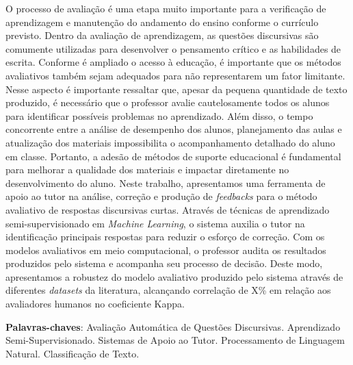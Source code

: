 O processo de avaliação é uma etapa muito importante para a verificação de aprendizagem e manutenção do andamento do ensino conforme o currículo previsto. Dentro da avaliação de aprendizagem, as questões discursivas são comumente utilizadas para desenvolver o pensamento crítico e as habilidades de escrita. Conforme é ampliado o acesso à educação, é importante que os métodos avaliativos também sejam adequados para não representarem um fator limitante. Nesse aspecto é importante ressaltar que, apesar da pequena quantidade de texto produzido, é necessário que o professor avalie cautelosamente todos os alunos para identificar possíveis problemas no aprendizado. Além disso, o tempo concorrente entre a análise de desempenho dos alunos, planejamento das aulas e atualização dos materiais impossibilita o acompanhamento detalhado do aluno em classe. Portanto, a adesão de métodos de suporte educacional é fundamental para melhorar a qualidade dos materiais e impactar diretamente no desenvolvimento do aluno. Neste trabalho, apresentamos uma ferramenta de apoio ao tutor na análise, correção e produção de \textit{feedbacks} para o método avaliativo de respostas discursivas curtas. Através de técnicas de aprendizado semi-supervisionado em \textit{Machine Learning}, o sistema auxilia o tutor na identificação principais respostas para reduzir o esforço de correção. Com os modelos avaliativos em meio computacional, o professor audita os resultados produzidos pelo sistema e acompanha seu processo de decisão. Deste modo, apresentamos a robustez do modelo avaliativo produzido pelo sistema através de diferentes \textit{datasets} da literatura, alcançando correlação de X\% em relação aos avaliadores humanos no coeficiente Kappa.

\textbf{Palavras-chaves}: Avaliação Automática de Questões Discursivas. Aprendizado Semi-Supervisionado. Sistemas de Apoio ao Tutor. Processamento de Linguagem Natural. Classificação de Texto.